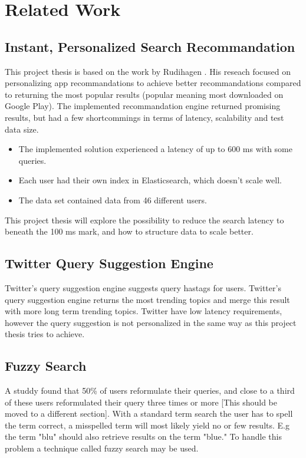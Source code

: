 \chapter{Related Work}
\label{ch:related-work}

\section{Instant, Personalized Search Recommandation}
This project thesis is based on the work by Rudihagen \cite{master-thesis}.
His reseach focused on personalizing app recommandations to achieve better recommandations compared to returning the most popular results (popular meaning most downloaded on Google Play).
The implemented recommandation engine returned promising results, but had a few shortcommings in terms of latency, scalability and test data size.

\begin{itemize}
  \item The implemented solution experienced a latency of up to 600 ms with some queries.
  \item Each user had their own index in Elasticsearch, which doesn't scale well.
  \item The data set contained data from 46 different users.
\end{itemize}

This project thesis will explore the possibility to reduce the search latency to beneath the 100 ms mark, and how to structure data to scale better.

\section{Twitter Query Suggestion Engine}
Twitter’s query suggestion engine \cite{twitter-suggestion} suggests query hastags for users.
Twitter’s query suggestion engine \cite{twitter-suggestion} returns the most trending topics and merge this result with more long term trending topics.
Twitter have low latency requirements, however the query suggestion is not personalized in the same way as this project thesis tries to achieve.

\section{Fuzzy Search}
A studdy found that 50\% of users reformulate their queries, and close to a third of these users reformulated their query three times or more \cite{query-reformulate}[This should be moved to a different section].
With a standard term search the user has to spell the term correct, a misspelled term will most likely yield no or few results.
E.g the term "blu" should also retrieve results on the term "blue."
To handle this problem a technique called fuzzy search may be used.

